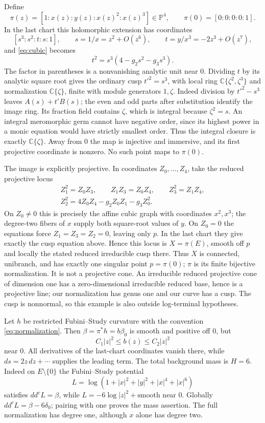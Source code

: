 \documentclass[11pt]{article}
\newcommand{\ddc}{dd^c}
\newcommand{\C}{\mathbb C}
\begin{document}
Define
\[
 \pi(z)=[1:x(z):y(z):x(z)^2:x(z)^3]\in\mathbb P^4,
 \qquad \pi(0)=[0:0:0:0:1].
\]
In the last chart this holomorphic extension has coordinates
\[
 [s^3:s^2:t:s:1],\qquad s=1/x=z^2+O(z^6),
 \qquad t=y/x^3=-2z^3+O(z^7),
\]
and \eqref{eq:cubic} becomes
\[
 t^2=s^3(4-g_2s^2-g_3s^3).
\]
The factor in parentheses is a nonvanishing analytic unit near $0$.
Dividing $t$ by its analytic square root gives the ordinary cusp
$t'^2=s^3$, with local ring $\C\{\zeta^2,\zeta^3\}$ and
normalization $\C\{\zeta\}$, finite with module generators
$1,\zeta$. Indeed division by $t'^2-s^3$ leaves
$A(s)+t'B(s)$; the even and odd parts after substitution identify
the image ring. Its fraction field contains $\zeta$, which is integral
because $\zeta^2=s$. An integral meromorphic germ cannot have negative
order, since its highest power in a monic equation would have strictly
smallest order. Thus the integral closure is exactly $\C\{\zeta\}$.
Away from $0$ the map is injective and immersive, and
its first projective coordinate is nonzero. No such point maps to
$\pi(0)$.

The image is explicitly projective. In coordinates $Z_0,\ldots,Z_4$,
take the reduced projective locus
\begin{gather*}
 Z_1^2=Z_0Z_3,\qquad Z_1Z_3=Z_0Z_4,\qquad Z_3^2=Z_1Z_4,\\
 Z_2^2=4Z_0Z_4-g_2Z_0Z_1-g_3Z_0^2.
\end{gather*}
On $Z_0\ne0$ this is precisely the affine cubic graph with
coordinates $x^2,x^3$; the degree-two fibers of $x$ supply both
square-root values of $y$. On $Z_0=0$ the equations force
$Z_1=Z_3=Z_2=0$, leaving only $p$. In the last chart they give
exactly the cusp equation above. Hence this locus is $X=\pi(E)$,
smooth off $p$ and locally the stated reduced irreducible cusp there.
Thus $X$ is connected, unibranch, and has exactly one singular point
$p=\pi(0)$; $\pi$ is its finite bijective normalization.
It is not a projective cone. An irreducible reduced projective cone
of dimension one has a zero-dimensional irreducible reduced base,
hence is a projective line; our normalization has genus one and
our curve has a cusp. The cusp is nonnormal, so this example is
also outside log-terminal hypotheses.

Let $h$ be restricted Fubini--Study curvature with the convention
\eqref{eq:normalization}. Then $\beta=\pi^*h=b\beta_0$ is
smooth and positive off $0$, but
\[
 C_1|z|^2\leq b(z)\leq C_2|z|^2
\]
near $0$. All derivatives of the last-chart coordinates vanish
there, while $ds=2z\,dz+\cdots$ supplies the leading term.
The total background mass is $H=6$. Indeed on $E\setminus\{0\}$
the Fubini--Study potential
\[
 L=\log(1+|x|^2+|y|^2+|x|^4+|x|^6)
\]
satisfies $\ddc L=\beta$, while $L=-6\log|z|^2+\text{smooth}$
near $0$. Globally $\ddc L=\beta-6\delta_0$; pairing with one
proves the mass assertion. The full normalization has degree one,
although $x$ alone has degree two.
\end{document}
